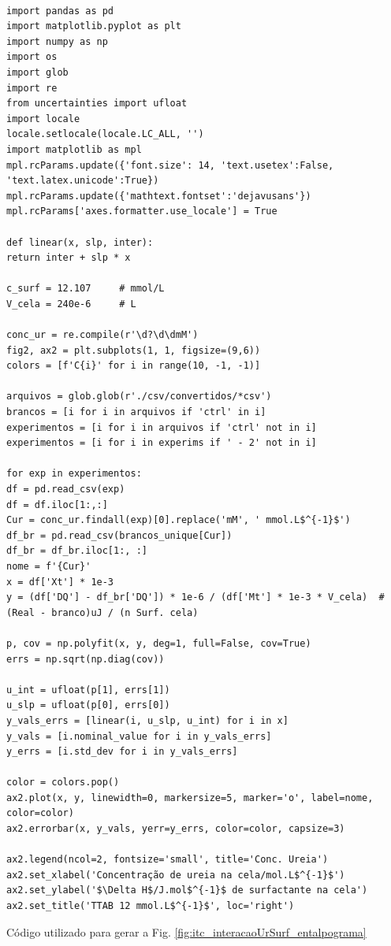 \begin{listing}[H]
	\begin{verbatim}

import pandas as pd
import matplotlib.pyplot as plt
import numpy as np
import os
import glob
import re
from uncertainties import ufloat
import locale
locale.setlocale(locale.LC_ALL, '')
import matplotlib as mpl
mpl.rcParams.update({'font.size': 14, 'text.usetex':False, 'text.latex.unicode':True})
mpl.rcParams.update({'mathtext.fontset':'dejavusans'})
mpl.rcParams['axes.formatter.use_locale'] = True

def linear(x, slp, inter):
return inter + slp * x

c_surf = 12.107     # mmol/L
V_cela = 240e-6     # L

conc_ur = re.compile(r'\d?\d\dmM')
fig2, ax2 = plt.subplots(1, 1, figsize=(9,6))
colors = [f'C{i}' for i in range(10, -1, -1)]

arquivos = glob.glob(r'./csv/convertidos/*csv')
brancos = [i for i in arquivos if 'ctrl' in i]
experimentos = [i for i in arquivos if 'ctrl' not in i]
experimentos = [i for i in experims if ' - 2' not in i]

for exp in experimentos:
df = pd.read_csv(exp)
df = df.iloc[1:,:]
Cur = conc_ur.findall(exp)[0].replace('mM', ' mmol.L$^{-1}$')
df_br = pd.read_csv(brancos_unique[Cur])
df_br = df_br.iloc[1:, :]
nome = f'{Cur}'
x = df['Xt'] * 1e-3
y = (df['DQ'] - df_br['DQ']) * 1e-6 / (df['Mt'] * 1e-3 * V_cela)  # (Real - branco)uJ / (n Surf. cela)

p, cov = np.polyfit(x, y, deg=1, full=False, cov=True)
errs = np.sqrt(np.diag(cov))

u_int = ufloat(p[1], errs[1])
u_slp = ufloat(p[0], errs[0])
y_vals_errs = [linear(i, u_slp, u_int) for i in x]
y_vals = [i.nominal_value for i in y_vals_errs]
y_errs = [i.std_dev for i in y_vals_errs]

color = colors.pop()
ax2.plot(x, y, linewidth=0, markersize=5, marker='o', label=nome, color=color)
ax2.errorbar(x, y_vals, yerr=y_errs, color=color, capsize=3)

ax2.legend(ncol=2, fontsize='small', title='Conc. Ureia')
ax2.set_xlabel('Concentração de ureia na cela/mol.L$^{-1}$')
ax2.set_ylabel('$\Delta H$/J.mol$^{-1}$ de surfactante na cela')
ax2.set_title('TTAB 12 mmol.L$^{-1}$', loc='right')
\end{verbatim}
\caption{Código utilizado para gerar a Fig. \ref{fig:itc_interacaoUrSurf_entalpograma}}
\label{lst:codigo_itc_ureia}
\end{listing}